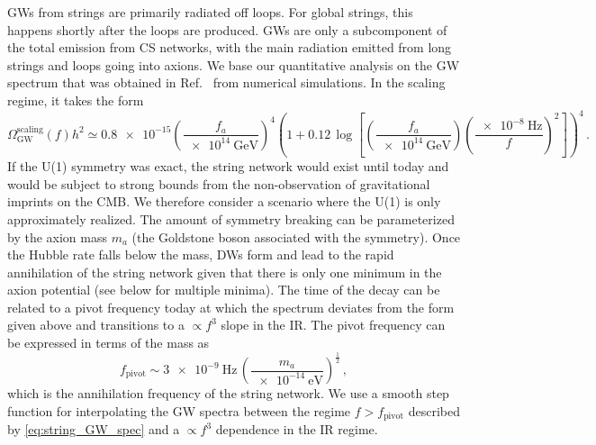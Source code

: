 \documentclass{article}
\newcommand*{\GW}{\ensuremath{\mathrm{GW}}\xspace}
\begin{document}
GWs from strings are primarily radiated off loops. For global strings, this happens shortly after the loops are produced.  
GWs are only a subcomponent of the total emission from CS networks, with the main radiation emitted from long strings and loops going into axions. We base our quantitative analysis on the GW spectrum that was obtained in Ref.~\cite{Gorghetto:2020qws} from numerical simulations. In the scaling regime, it takes the form
\begin{equation}\label{eq:string_GW_spec}
     \Omega_{\GW}^\mathrm{scaling}(f)h^2 \simeq \num{0.8e-15} \left(\frac{f_{a}}{\SI{e14}{\GeV}}\right)^{4}\left(1 + 0.12\, \log\left[\left(\frac{f_{a}}{\SI{e14}{\GeV}}\right) \left(\frac{\SI{e-8}{\Hz}}{f} \right)^{2} \right] \right)^{4} \,.
\end{equation}  
If the U(1) symmetry was exact, the string network would exist until today and would be subject to strong bounds from the non-observation of gravitational imprints on the CMB. We therefore consider a scenario where the U(1) is only approximately realized. The amount of symmetry breaking can be parameterized by the axion mass $m_a$ (the Goldstone boson associated with the symmetry). Once the Hubble rate falls below the mass, DWs form and lead to the rapid annihilation of the string network given that there is only one minimum in the axion potential (see below for multiple minima). The time of the decay can be related to a pivot frequency today at which the spectrum deviates from the form given above and transitions to a $\propto f^3$ slope in the IR.
The pivot frequency can be expressed in terms of the mass as
\begin{equation}
    f_\mathrm{pivot} \sim \SI{3e-9}{\Hz} \, \left(\frac{m_a}{\SI{e-14}{\eV}}\right)^{\frac{1}{2}}\,,
\end{equation}
which is the annihilation frequency of the string network. We use a smooth step function for interpolating the GW spectra between the regime $f>f_{\mathrm{pivot}}$ described by \cref{eq:string_GW_spec} and a $\propto f^{3}$ dependence in the IR regime.
\end{document}
